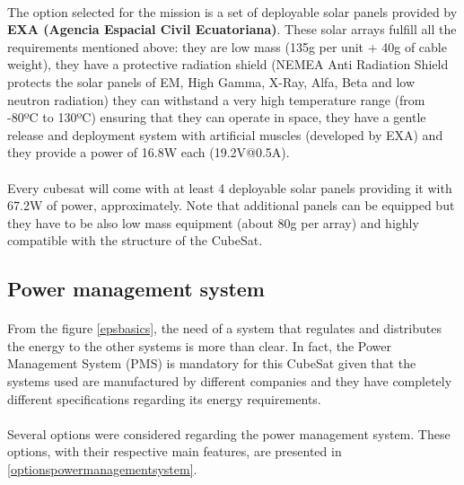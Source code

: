 \paragraph{}The option selected for the mission is a set of deployable solar panels provided by \textbf{EXA (Agencia Espacial Civil Ecuatoriana)}. These solar arrays fulfill all the requirements mentioned above: they are low mass (135g per unit + 40g of cable weight), they have a protective radiation shield (NEMEA Anti Radiation Shield protects the solar panels of EM, High Gamma, X-Ray, Alfa, Beta and low neutron radiation) they can withstand a very high temperature range (from -80ºC to 130ºC) ensuring that they can operate in space, they have a gentle release and deployment system with artificial muscles (developed by EXA) and they provide a power of 16.8W each (19.2V@0.5A).

\paragraph{}Every cubesat will come with at least 4 deployable solar panels providing it with 67.2W of power, approximately. Note that additional panels can be equipped but they have to be also low mass equipment (about 80g per array) and highly compatible with the structure of the CubeSat.

\subsection{Power management system}
\paragraph{}From the figure \ref{epsbasics}, the need of a system that regulates and distributes the energy to the other systems is more than clear. In fact, the  Power Management System (PMS) is mandatory for this CubeSat given that the systems used are manufactured by different companies and they have completely different specifications regarding its energy requirements.

\paragraph{}Several options were considered regarding the power management system. These options, with their respective main features, are presented in \ref{optionspowermanagementsystem}.

